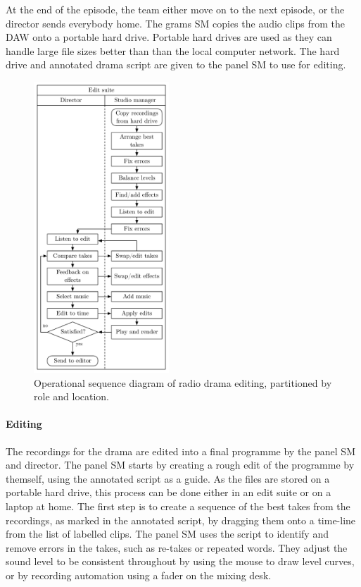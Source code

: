 At the end of the episode, the team either move on to the next episode, or the director sends everybody home.  The
grams SM copies the audio clips from the DAW onto a portable hard drive.  Portable hard drives are used as they can
handle large file sizes better than than the local computer network.  The hard drive and annotated drama
script are given to the panel SM to use for editing.

\begin{figure}
  \centering
  \includegraphics[width=2in]{figs/drama-editing-workflow.pdf}
  \caption{Operational sequence diagram of radio drama editing, partitioned by role and location.}
  \label{fig:ethno-drama-editing}
\end{figure}

\paragraph{Editing}
The recordings for the drama are edited into a final programme by the panel SM and director. The panel SM starts by
creating a rough edit of the programme by themself, using the annotated script as a guide.  As the files are stored
on a portable hard drive, this process can be done either in an edit suite or on a laptop at home. The first step is to
create a sequence of the best takes from the recordings, as marked in the annotated script, by dragging them onto a
time-line from the list of labelled clips.  The panel SM uses the script to identify and remove errors in the takes,
such as re-takes or repeated words.  They adjust the sound level to be consistent throughout by using the mouse
to draw level curves, or by recording automation using a fader on the mixing desk.

